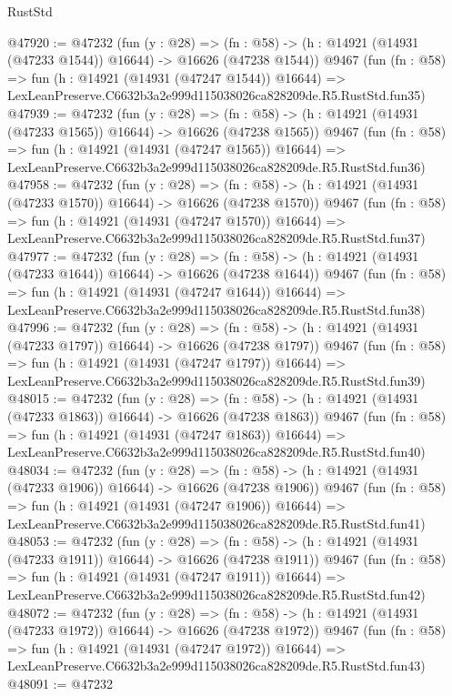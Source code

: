 \begin{lexlean}{RustStd}
\begin{coremodule}
@47920 := @47232
    (fun (y : @28) =>
    (fn : @58) -> (h : @14921 (@14931 (@47233 @1544)) @16644) -> @16626 (@47238 @1544))
    @9467
    (fun (fn : @58) =>
    fun (h : @14921 (@14931 (@47247 @1544)) @16644) =>
    LexLeanPreserve.C6632b3a2e999d115038026ca828209de.R5.RustStd.fun35)
@47939 := @47232
    (fun (y : @28) =>
    (fn : @58) -> (h : @14921 (@14931 (@47233 @1565)) @16644) -> @16626 (@47238 @1565))
    @9467
    (fun (fn : @58) =>
    fun (h : @14921 (@14931 (@47247 @1565)) @16644) =>
    LexLeanPreserve.C6632b3a2e999d115038026ca828209de.R5.RustStd.fun36)
@47958 := @47232
    (fun (y : @28) =>
    (fn : @58) -> (h : @14921 (@14931 (@47233 @1570)) @16644) -> @16626 (@47238 @1570))
    @9467
    (fun (fn : @58) =>
    fun (h : @14921 (@14931 (@47247 @1570)) @16644) =>
    LexLeanPreserve.C6632b3a2e999d115038026ca828209de.R5.RustStd.fun37)
@47977 := @47232
    (fun (y : @28) =>
    (fn : @58) -> (h : @14921 (@14931 (@47233 @1644)) @16644) -> @16626 (@47238 @1644))
    @9467
    (fun (fn : @58) =>
    fun (h : @14921 (@14931 (@47247 @1644)) @16644) =>
    LexLeanPreserve.C6632b3a2e999d115038026ca828209de.R5.RustStd.fun38)
@47996 := @47232
    (fun (y : @28) =>
    (fn : @58) -> (h : @14921 (@14931 (@47233 @1797)) @16644) -> @16626 (@47238 @1797))
    @9467
    (fun (fn : @58) =>
    fun (h : @14921 (@14931 (@47247 @1797)) @16644) =>
    LexLeanPreserve.C6632b3a2e999d115038026ca828209de.R5.RustStd.fun39)
@48015 := @47232
    (fun (y : @28) =>
    (fn : @58) -> (h : @14921 (@14931 (@47233 @1863)) @16644) -> @16626 (@47238 @1863))
    @9467
    (fun (fn : @58) =>
    fun (h : @14921 (@14931 (@47247 @1863)) @16644) =>
    LexLeanPreserve.C6632b3a2e999d115038026ca828209de.R5.RustStd.fun40)
@48034 := @47232
    (fun (y : @28) =>
    (fn : @58) -> (h : @14921 (@14931 (@47233 @1906)) @16644) -> @16626 (@47238 @1906))
    @9467
    (fun (fn : @58) =>
    fun (h : @14921 (@14931 (@47247 @1906)) @16644) =>
    LexLeanPreserve.C6632b3a2e999d115038026ca828209de.R5.RustStd.fun41)
@48053 := @47232
    (fun (y : @28) =>
    (fn : @58) -> (h : @14921 (@14931 (@47233 @1911)) @16644) -> @16626 (@47238 @1911))
    @9467
    (fun (fn : @58) =>
    fun (h : @14921 (@14931 (@47247 @1911)) @16644) =>
    LexLeanPreserve.C6632b3a2e999d115038026ca828209de.R5.RustStd.fun42)
@48072 := @47232
    (fun (y : @28) =>
    (fn : @58) -> (h : @14921 (@14931 (@47233 @1972)) @16644) -> @16626 (@47238 @1972))
    @9467
    (fun (fn : @58) =>
    fun (h : @14921 (@14931 (@47247 @1972)) @16644) =>
    LexLeanPreserve.C6632b3a2e999d115038026ca828209de.R5.RustStd.fun43)
@48091 := @47232

\end{coremodule}
\end{lexlean}
